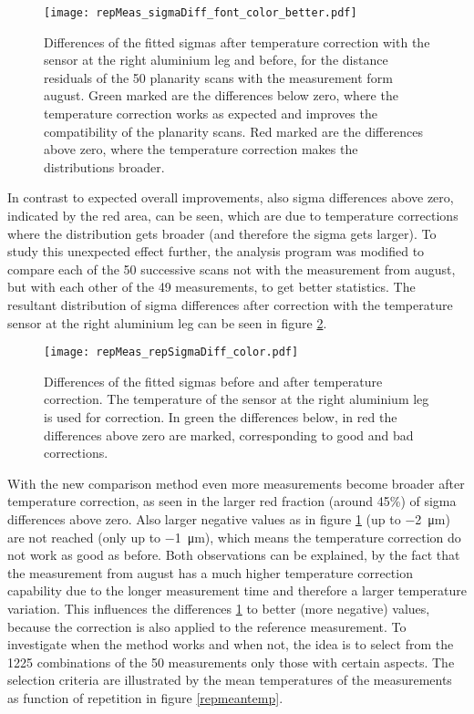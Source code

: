 \documentclass[
a4paper,                                %
twoside,                                %
BCOR1.4cm,                      %
10pt,                           %
headings=normal,                %
headsepline,                    %
clearplainpage, %
final,                                  %
div=14,
parskip=full,
openright,
bibliography=toc
]{scrreprt}
\begin{document}
\begin{figure}[H]
	\centering
	\texttt{[image: repMeas\_sigmaDiff\_font\_color\_better.pdf]}
	\caption{Differences of the fitted sigmas after temperature correction with the sensor at the right aluminium leg and before, for the distance residuals of the 50 planarity scans with the measurement form august. Green marked are the differences below zero, where the temperature correction works as expected and improves the compatibility of the planarity scans. Red marked are the differences above zero, where the temperature correction makes the distributions broader.}
	\label{sigmadiffbbrm}
\end{figure}

In contrast to expected overall improvements, also sigma differences above zero, indicated by the red area, can be seen, which are due to temperature corrections where the distribution gets broader (and therefore the sigma gets larger). To study this unexpected effect further, the analysis program was modified to compare each of the 50 successive scans not with the measurement from august, but with each other of the 49 measurements, to get better statistics. The resultant distribution of sigma differences after correction with the temperature sensor at the right aluminium leg can be seen in figure \ref{sigmadiffrep}.

\begin{figure}[H]
	\centering
	\texttt{[image: repMeas\_repSigmaDiff\_color.pdf]}
	\caption{Differences of the fitted sigmas before and after temperature correction. The temperature of the sensor at the right aluminium leg is used for correction. 
	In green the differences below, in red the differences above zero are marked, corresponding to good and bad corrections.
	}
	\label{sigmadiffrep}
\end{figure}

With the new comparison method even more measurements become broader after temperature correction, as seen in the larger red fraction (around 45\%) of sigma differences above zero. Also larger negative values as in figure \ref{sigmadiffbbrm} (up to \SI{-2}{\micro\m}) are not reached (only up to \SI{-1}{\micro\m}), which means the temperature correction do not work as good as before. Both observations can be explained, by the fact that the measurement from august has a much higher temperature correction capability due to the longer measurement time and therefore a larger temperature variation. This influences the differences \ref{sigmadiffbbrm} to better (more negative) values, because the correction is also applied to the reference measurement. To investigate when the method works and when not, the idea is to select from the 1225 combinations of the 50 measurements only those with certain aspects. The selection criteria are illustrated by the mean temperatures of the measurements as function of repetition in figure \ref{repmeantemp}.
\end{document}
